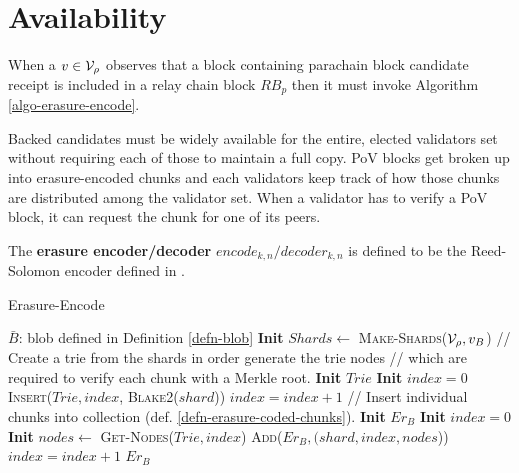 \section{Availability}

When a $v \in \mathcal{V}_\rho$ observes that a block containing parachain block
candidate receipt is included in a relay chain block $RB_p$ then it must invoke
Algorithm \ref{algo-erasure-encode}.
\newline

Backed candidates must be widely available for the entire, elected validators
set without requiring each of those to maintain a full copy. PoV blocks get
broken up into erasure-encoded chunks and each validators keep track of how
those chunks are distributed among the validator set. When a validator has to
verify a PoV block, it can request the chunk for one of its peers.

\begin{definition}
  \label{defn-erasure-encoder-decoder}
  The {\bf erasure encoder/decoder} {\bf $encode_{k,n}/decoder_{k,n}$ } is
  defined to be the Reed-Solomon encoder defined in \cite{??}.
\end{definition}

\begin{algorithm}[H]
  \caption[]{\sc Erasure-Encode}
  \label{algo-erasure-encode}
  \begin{algorithmic}[1]
    \Require
    $\bar{B}$: blob defined in Definition \ref{defn-blob}
    \State \textbf{Init} $Shards \leftarrow$ \textsc{Make-Shards}($\mathcal{V}_\rho, v_B$)
    \Statex
    \Statex // Create a trie from the shards in order generate the trie nodes
    \Statex // which are required to verify each chunk with a Merkle root.
    \State \textbf{Init} $Trie$
    \State \textbf{Init} $index = 0$
      \State \textsc{Insert}($Trie,index$, \textsc{Blake2}($shard$))
      \State $index = index + 1$
    \EndFor
    \Statex
    \Statex // Insert individual chunks into collection (def. \ref{defn-erasure-coded-chunks}).
    \State \textbf{Init} $Er_B$
    \State \textbf{Init} $index = 0$
      \State \textbf{Init} $nodes \leftarrow$ \textsc{Get-Nodes}($Trie, index$)
      \State \textsc{Add}($Er_B, (shard, index, nodes$))
      \State $index = index + 1$
    \EndFor
    \Statex
    \State \Return $Er_B$
  \end{algorithmic}
\end{algorithm}


